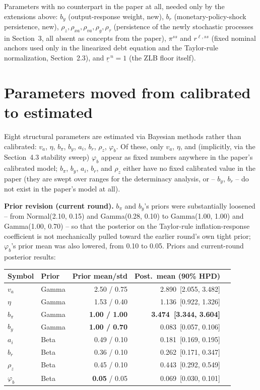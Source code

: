 \documentclass[11pt]{article}
\begin{document}
Parameters with no counterpart in the paper at all, needed only by the
extensions above: $b_y$ (output-response weight, new), $b_r$
(monetary-policy-shock persistence, new), $\rho_z,\rho_{xa},\rho_{va},\rho_g,\rho_\tau$
(persistence of the newly stochastic processes in Section~3, all
absent as concepts from the paper), $\pi^{ss}$ and $r^{\ell,ss}$ (fixed
nominal anchors used only in the linearized debt equation and the
Taylor-rule normalization, Section~2.3), and $\underline{r}^{\,n}=1$
(the ZLB floor itself).

\section{Parameters moved from calibrated to estimated}

Eight structural parameters are estimated via Bayesian methods rather
than calibrated: $v_a$, $\eta$, $b_\pi$, $b_y$, $a_i$, $b_r$, $\rho_z$,
$\varphi_b$. Of these, only $v_a$, $\eta$, and (implicitly, via the
Section~4.3 stability sweep) $\varphi_b$ appear as fixed numbers
anywhere in the paper's calibrated model; $b_\pi$, $b_y$, $a_i$, $b_r$,
and $\rho_z$ either have no fixed calibrated value in the paper (they
are swept over ranges for the determinacy analysis, or -- $b_y$, $b_r$
-- do not exist in the paper's model at all).

\textbf{Prior revision (current round).} $b_\pi$ and $b_y$'s priors were
substantially loosened -- from Normal(2.10, 0.15) and Gamma(0.28, 0.10)
to Gamma(1.00, 1.00) and Gamma(1.00, 0.70) -- so that the posterior on
the Taylor-rule inflation-response coefficient is not mechanically
pulled toward the earlier round's own tight prior; $\varphi_b$'s prior
mean was also lowered, from 0.10 to 0.05. Priors and current-round
posterior results:

\begin{center}
\small
\begin{tabular}{@{}llrrl@{}}
\toprule
Symbol & Prior & Prior mean/std & Post.\ mean (90\% HPD) & \\
\midrule
$v_a$ & Gamma & 2.50 / 0.75 & 2.890\ [2.055, 3.482] \\
$\eta$ & Gamma & 1.53 / 0.40 & 1.136\ [0.922, 1.326] \\
$b_\pi$ & Gamma & \textbf{1.00 / 1.00} & \textbf{3.474\ [3.344, 3.604]} \\
$b_y$ & Gamma & \textbf{1.00 / 0.70} & 0.083\ [0.057, 0.106] \\
$a_i$ & Beta & 0.49 / 0.10 & 0.181\ [0.169, 0.195] \\
$b_r$ & Beta & 0.36 / 0.10 & 0.262\ [0.171, 0.347] \\
$\rho_z$ & Beta & 0.45 / 0.10 & 0.443\ [0.292, 0.549] \\
$\varphi_b$ & Beta & \textbf{0.05} / 0.05 & 0.069\ [0.030, 0.101] \\
\bottomrule
\end{tabular}
\end{center}
\end{document}
